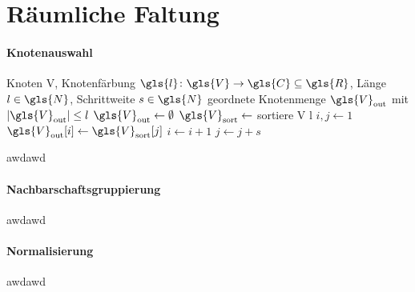 \section{Räumliche Faltung}
\label{raeumliche_faltung}

\paragraph{Knotenauswahl}
\label{knotenauswahl}

\begin{algorithm}[t]
\centering
\begin{algorithmic}
  \REQUIRE{} Knoten \gls{V}, Knotenfärbung $\gls{l} \colon \gls{V} \to \gls{C} \subseteq \gls{R}$, Länge $l \in \gls{N}$, Schrittweite $s \in \gls{N}$
  \ENSURE{} geordnete Knotenmenge $\gls{V}_{\mathrm{out}}$ mit $\left|\gls{V}_{\mathrm{out}}\right| \leq l$
  \STATE{} $\gls{V}_\mathrm{out} \leftarrow \emptyset$
  \STATE{} $\gls{V}_{\mathrm{sort}} \leftarrow$ sortiere \gls{V} \bzgl{} \gls{l}
  \STATE{} $i, j \leftarrow 1$
      \STATE{} $\gls{V}_{\mathrm{out}}\left[i\right] \leftarrow \gls{V}_{\mathrm{sort}}\left[j\right]$
    \ENDIF{}
  \ENDWHILE{}
  \STATE{} $i \leftarrow i + 1$
  \STATE{} $j \leftarrow j + s$
\end{algorithmic}
\caption[]{}
\label{alg:knotenauswahl}
\end{algorithm}

awdawd

\paragraph{Nachbarschaftsgruppierung}
\label{nachbarschaftsgruppierung}

awdawd

\paragraph{Normalisierung}
\label{normalisierung}

awdawd
